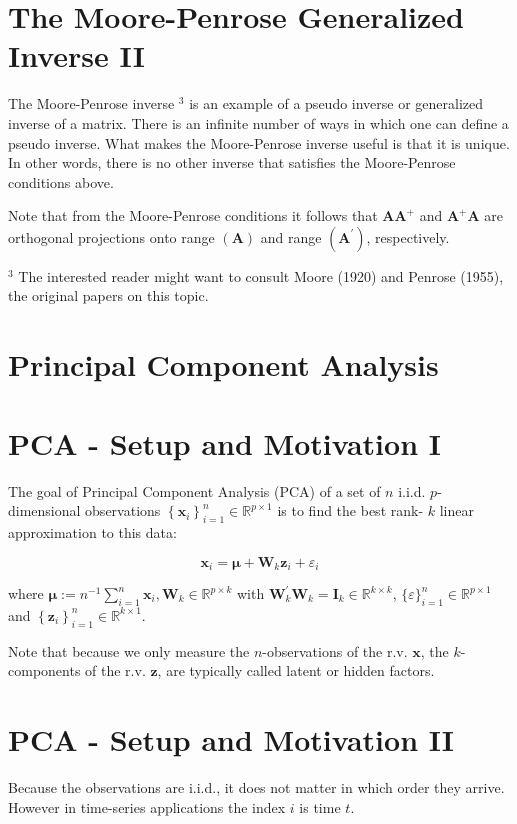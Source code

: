 \documentclass[11pt]{article}
\theoremstyle{plain} %
\theoremstyle{remark}
\begin{document}
\section*{The Moore-Penrose Generalized Inverse II}
The Moore-Penrose inverse ${ }^{3}$ is an example of a pseudo inverse or generalized inverse of a matrix. There is an infinite number of ways in which one can define a pseudo inverse. What makes the Moore-Penrose inverse useful is that it is unique. In other words, there is no other inverse that satisfies the Moore-Penrose conditions above.

Note that from the Moore-Penrose conditions it follows that $\mathbf{A A}^{+}$ and $\mathbf{A}^{+} \mathbf{A}$ are orthogonal projections onto range $(\mathbf{A})$ and range $\left(\mathbf{A}^{\prime}\right)$, respectively.

${ }^{3}$ The interested reader might want to consult Moore (1920) and Penrose (1955), the original papers on this topic.

\section*{Principal Component Analysis}
\section*{PCA - Setup and Motivation I}
The goal of Principal Component Analysis (PCA) of a set of $n$ i.i.d. $p$-dimensional observations $\left\{\mathbf{x}_{i}\right\}_{i=1}^{n} \in \mathbb{R}^{p \times 1}$ is to find the best rank- $k$ linear approximation to this data:

$$
\mathbf{x}_{i}=\boldsymbol{\mu}+\mathbf{W}_{k} \mathbf{z}_{i}+\varepsilon_{i}
$$

where $\boldsymbol{\mu}:=n^{-1} \sum_{i=1}^{n} \mathbf{x}_{i}, \mathbf{W}_{k} \in \mathbb{R}^{p \times k}$ with $\mathbf{W}_{k}^{\prime} \mathbf{W}_{k}=\mathbf{I}_{k} \in \mathbb{R}^{k \times k}$, $\{\varepsilon\}_{i=1}^{n} \in \mathbb{R}^{p \times 1}$ and $\left\{\mathbf{z}_{i}\right\}_{i=1}^{n} \in \mathbb{R}^{k \times 1}$.

Note that because we only measure the $n$-observations of the r.v. $\mathbf{x}$, the $k$-components of the r.v. $\mathbf{z}$, are typically called latent or hidden factors.

\section*{PCA - Setup and Motivation II}
Because the observations are i.i.d., it does not matter in which order they arrive. However in time-series applications the index $i$ is time $t$.
\end{document}
